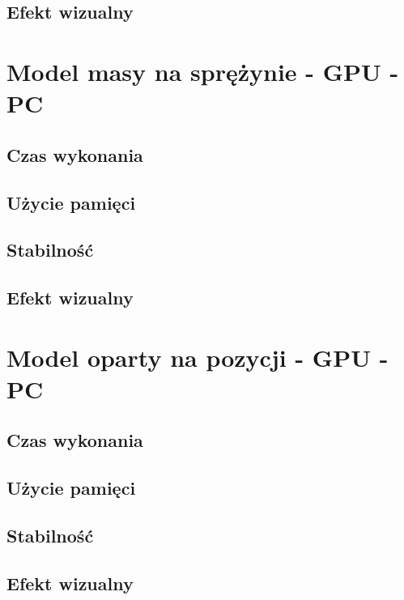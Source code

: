 		\subsection{Efekt wizualny}
		\label{t:wyniki:poz_cpu_andro:wizual}
		
		
	\section{Model masy na sprężynie - GPU - PC}
	\label{t:wyniki:masa_gpu_pc}
	
		\subsection{Czas wykonania}
		\label{t:wyniki:masa_gpu_pc:czas}
		
		\subsection{Użycie pamięci}
		\label{t:wyniki:masa_gpu_pc:pamiec}
		
		\subsection{Stabilność}
		\label{t:wyniki:masa_gpu_pc:stabilnosc}
		
		\subsection{Efekt wizualny}
		\label{t:wyniki:masa_gpu_pc:wizual}
		
		
	\section{Model oparty na pozycji - GPU - PC}
	\label{t:wyniki:poz_gpu_pc}
	
		\subsection{Czas wykonania}
		\label{t:wyniki:poz_gpu_pc:czas}
		
		\subsection{Użycie pamięci}
		\label{t:wyniki:poz_gpu_pc:pamiec}
		
		\subsection{Stabilność}
		\label{t:wyniki:poz_gpu_pc:stabilnosc}
		
		\subsection{Efekt wizualny}
		\label{t:wyniki:poz_gpu_pc:wizual}
